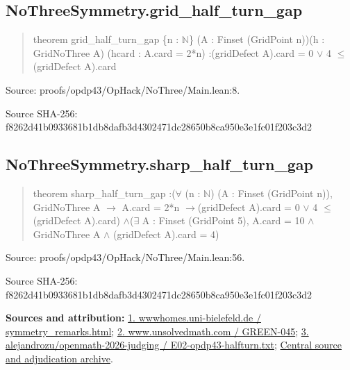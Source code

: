 \documentclass[11pt,a4paper]{article}
\begin{document}
\begin{samepage}
\subsection{NoThreeSymmetry.grid\_half\_turn\_gap}
\begin{quote}\small\ttfamily theorem grid\_half\_turn\_gap \{n : \ensuremath{\mathbb{N}}\} (A : Finset (GridPoint n))\newline     (h : GridNoThree A) (hcard : A.card = 2*n) :\newline     (gridDefect A).card = 0 \ensuremath{\vee} 4 \ensuremath{\leq} (gridDefect A).card\end{quote}
{\small Source: proofs/opdp43/OpHack/NoThree/Main.lean:8.\par}

{\small Source SHA-256: f8262d41b0933681b1db8dafb3d4302471dc28650b8ca950e3e1fc01f203c3d2\par}

\end{samepage}
\begin{samepage}
\subsection{NoThreeSymmetry.sharp\_half\_turn\_gap}
\begin{quote}\small\ttfamily theorem sharp\_half\_turn\_gap :\newline     (\ensuremath{\forall} (n : \ensuremath{\mathbb{N}}) (A : Finset (GridPoint n)), GridNoThree A \ensuremath{\to} A.card = 2*n \ensuremath{\to}\newline       (gridDefect A).card = 0 \ensuremath{\vee} 4 \ensuremath{\leq} (gridDefect A).card) \ensuremath{\wedge}\newline     (\ensuremath{\exists} A : Finset (GridPoint 5), A.card = 10 \ensuremath{\wedge} GridNoThree A \ensuremath{\wedge} (gridDefect A).card = 4)\end{quote}
{\small Source: proofs/opdp43/OpHack/NoThree/Main.lean:56.\par}

{\small Source SHA-256: f8262d41b0933681b1db8dafb3d4302471dc28650b8ca950e3e1fc01f203c3d2\par}

{\small\textbf{Sources and attribution:} \href{https://wwwhomes.uni-bielefeld.de/achim/no3in/symmetry_remarks.html}{1. wwwhomes.uni-bielefeld.de / symmetry\_remarks.html}; \href{https://www.unsolvedmath.com/problems/GREEN-045}{2. www.unsolvedmath.com / GREEN-045}; \href{https://github.com/alejandrozu/openmath-2026-judging/blob/d0ed487f487fa7ec814ff705ab55249983fe8707/OpenMath-Judging/review/entries/E02-opdp43-halfturn.txt}{3. alejandrozu/openmath-2026-judging / E02-opdp43-halfturn.txt}; \href{https://github.com/alejandrozu/openmath-2026-judging}{Central source and adjudication archive}.\par}

\end{samepage}
\end{document}

